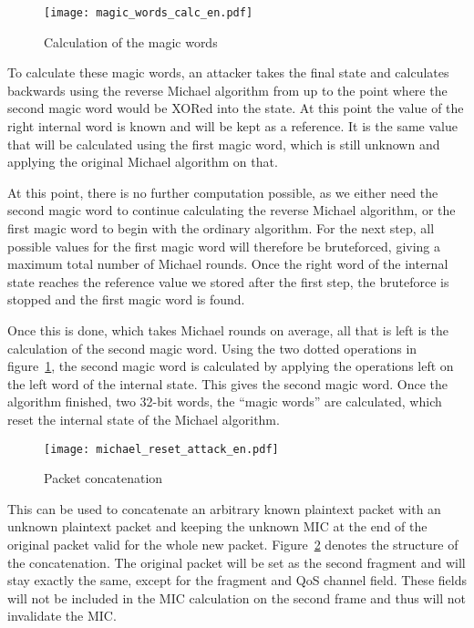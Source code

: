 \documentclass[a4paper,10pt]{scrartcl}
\begin{document}
\begin{figure}[htbp]
  \centering
    \texttt{[image: magic\_words\_calc\_en.pdf]}
  \caption{Calculation of the magic words}
  \label{figure:magic_words_calc}
\end{figure}

To calculate these magic words, an attacker takes the final state and calculates backwards using the reverse Michael algorithm
from \citep{BT08} up to the point where the second magic word would be XORed into the state. At this point the value of the right
internal word is known and will be kept as a reference. It is the same value that will be calculated using the first magic word, which
is still unknown and applying the original Michael algorithm on that.

At this point, there is no further computation possible, as we either need the second magic word to continue calculating the reverse 
Michael algorithm, or the first magic word to begin with the ordinary algorithm. For the next step, all possible values for the first
magic word will therefore be bruteforced, giving a maximum total number of  Michael rounds. Once the right word of the internal state
reaches the reference value we stored after the first step, the bruteforce is stopped and the first magic word is found.

Once this is done, which takes  Michael rounds on average, all that is left is the calculation of the second magic word. Using
the two dotted operations in figure~\ref{figure:magic_words_calc}, the second magic word is calculated by applying the operations left on
the left word of the internal state. This gives the second magic word. Once the algorithm finished, two 32-bit words, the ``magic words''
are calculated, which reset the internal state of the Michael algorithm.

\begin{figure}[htbp]
  \centering
    \texttt{[image: michael\_reset\_attack\_en.pdf]}
  \caption{Packet concatenation}
  \label{figure:michael_reset_attack}
\end{figure}

This can be used to concatenate an arbitrary known plaintext packet with an unknown plaintext packet and keeping the unknown MIC at
the end of the original packet valid for the whole new packet. Figure~\ref{figure:michael_reset_attack} denotes the structure of the
concatenation. The original packet will be set as the second fragment and will stay exactly the same, except for the fragment and QoS
channel field. These fields will not be included in the MIC calculation on the second frame and thus will not invalidate the MIC.
\end{document}

